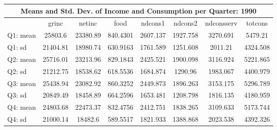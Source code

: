 \begin{tabular}{l*{7}{c}}
\hline\hline
\multicolumn{8}{c}{Means and Std. Dev. of Income and Consumption per Quarter: 1990}  \\
\hline    
            &       grinc&      netinc&        food&     ndcons1&     ndcons2&  ndconsserv&     totcons\\
\hline
Q1: mean      &     25803.6&    23380.89&    840.4301&    2607.137&    1927.758&    3270.691&     5479.21\\
Q1: sd    &    21404.81&    18980.74&    630.9163&    1761.589&    1251.608&     2011.21&    4324.508\\
Q2: mean     &    25716.01&    23213.96&    829.1843&    2425.521&    1900.098&    3116.924&    5221.865\\
Q2: sd    &    21212.75&    18538.62&    618.5536&    1684.874&     1290.96&    1983.067&    4400.979\\
Q3: mean     &    25438.94&    23082.92&    860.3252&    2449.873&    1896.263&    3153.175&    5296.789\\
Q3: sd      &    20849.49&    18458.89&    664.2596&    1653.481&    1208.798&    1816.135&    4180.959\\
Q4: mean      &    24803.68&    22473.37&    832.4756&    2412.751&    1838.265&    3109.633&    5173.744\\
Q4: sd     &    21000.14&     18482.6&    589.5517&    1821.933&    1388.868&    2023.538&    4392.326\\
\hline\hline
\end{tabular}
